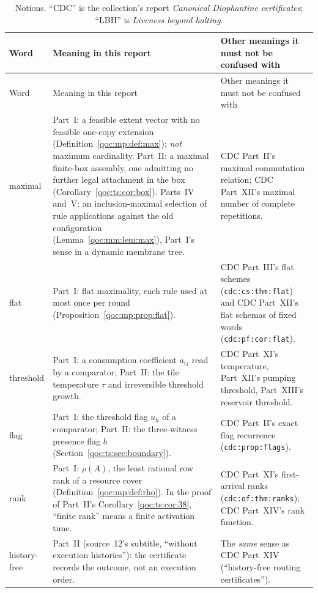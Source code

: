 \documentclass[11pt,letterpaper]{article}
\theoremstyle{definition}
\theoremstyle{remark}
\newcommand{\lab}[1]{\nolinkurl{#1}}
\begin{document}
\begin{longtable}{@{}L{0.15\textwidth}L{0.38\textwidth}L{0.38\textwidth}@{}}
\caption{Notions. ``CDC'' is the collection's report \emph{Canonical Diophantine certificates}; ``LBH'' is \emph{Liveness beyond halting}.}\label{qoc:tab:notions}\\
\toprule
Word & Meaning in this report & Other meanings it must not be confused with\\\midrule\endfirsthead
\toprule
Word & Meaning in this report & Other meanings it must not be confused with\\\midrule\endhead
maximal & Part~I: a feasible extent vector with no feasible one-copy extension (Definition~\ref{qoc:mp:def:max}); \emph{not} maximum cardinality. Part~II: a maximal finite-box assembly, one admitting no further legal attachment in the box (Corollary~\ref{qoc:ts:cor:box}). Parts~IV and~V: an inclusion-maximal selection of rule applications against the old configuration (Lemma~\ref{qoc:mm:lem:max}), Part~I's sense in a dynamic membrane tree. & CDC Part~II's maximal commutation relation; CDC Part~XII's maximal number of complete repetitions. \\
flat & Part~I: flat maximality, each rule used at most once per round (Proposition~\ref{qoc:mp:prop:flat}). & CDC Part~III's flat schemes (\lab{cdc:cs:thm:flat}) and CDC Part~XII's flat schemas of fixed words (\lab{cdc:pf:cor:flat}). \\
threshold & Part~I: a consumption coefficient $a_{ij}$ read by a comparator; Part~II: the tile temperature $\tau$ and irreversible threshold growth. & CDC Part~XI's temperature, Part~XII's pumping threshold, Part~XIII's reservoir threshold. \\
flag & Part~I: the threshold flag $u_h$ of a comparator; Part~II: the three-witness presence flag $b$ (Section~\ref{qoc:ts:sec:boundary}). & CDC Part~II's exact flag recurrence (\lab{cdc:prop:flags}). \\
rank & Part~I: $\rho(A)$, the least rational row rank of a resource cover (Definition~\ref{qoc:mp:def:rho}). In the proof of Part~II's Corollary~\ref{qoc:ts:cor:38}, ``finite rank'' means a finite activation time. & CDC Part~XI's first-arrival ranks (\lab{cdc:of:thm:ranks}); CDC Part~XIV's rank function. \\
history-free & Part~II (source~12's subtitle, ``without execution histories''): the certificate records the outcome, not an execution order. & The \emph{same} sense as CDC Part~XIV (``history-free routing certificates''). \\

\end{longtable}
\end{document}
